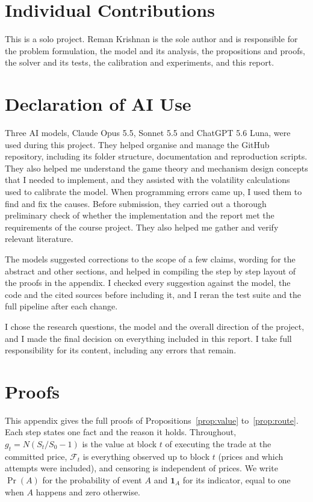 \documentclass[11pt]{article}
\begin{document}
\section*{Individual Contributions}
This is a solo project. Reman Krishnan is the sole author and is responsible for the problem formulation, the model and its analysis, the propositions and proofs, the solver and its tests, the calibration and experiments, and this report.

\section*{Declaration of AI Use}
Three AI models, Claude Opus 5.5, Sonnet 5.5 and ChatGPT 5.6 Luna, were used during this project. They helped organise and manage the GitHub repository, including its folder structure, documentation and reproduction scripts. They also helped me understand the game theory and mechanism design concepts that I needed to implement, and they assisted with the volatility calculations used to calibrate the model. When programming errors came up, I used them to find and fix the causes. Before submission, they carried out a thorough preliminary check of whether the implementation and the report met the requirements of the course project. They also helped me gather and verify relevant literature.

The models suggested corrections to the scope of a few claims, wording for the abstract and other sections, and helped in compiling the step by step layout of the proofs in the appendix. I checked every suggestion against the model, the code and the cited sources before including it, and I reran the test suite and the full pipeline after each change.

I chose the research questions, the model and the overall direction of the project, and I made the final decision on everything included in this report. I take full responsibility for its content, including any errors that remain.

\appendix
\section{Proofs}\label{app:proofs}
This appendix gives the full proofs of Propositions~\ref{prop:value} to~\ref{prop:route}. Each step states one fact and the reason it holds. Throughout, $g_t=N(S_t/S_0-1)$ is the value at block $t$ of executing the trade at the committed price, $\mathcal F_t$ is everything observed up to block $t$ (prices and which attempts were included), and censoring is independent of prices. We write $\Pr(A)$ for the probability of event $A$ and $\mathbf 1_A$ for its indicator, equal to one when $A$ happens and zero otherwise.
\end{document}
